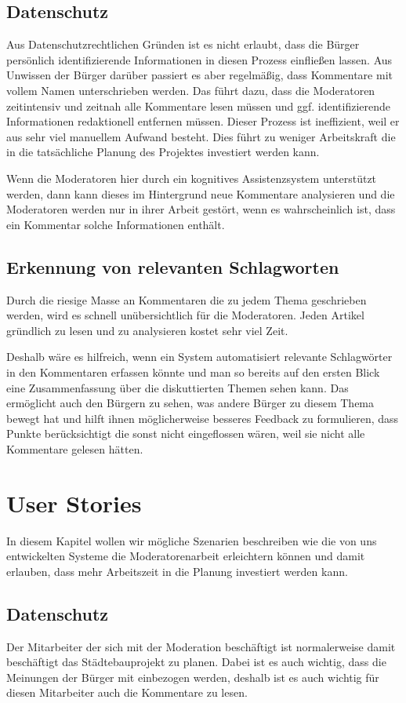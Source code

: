 \documentclass[runningheads]{llncs}
\begin{document}
\subsection{Datenschutz}
Aus Datenschutzrechtlichen Gründen ist es nicht erlaubt, dass die Bürger persönlich identifizierende Informationen in diesen Prozess einfließen lassen.
Aus Unwissen der Bürger darüber passiert es aber regelmäßig, dass Kommentare mit vollem Namen unterschrieben werden.
Das führt dazu, dass die Moderatoren zeitintensiv und zeitnah alle Kommentare lesen müssen und ggf. identifizierende Informationen redaktionell entfernen müssen.
Dieser Prozess ist ineffizient, weil er aus sehr viel manuellem Aufwand besteht.
Dies führt zu weniger Arbeitskraft die in die tatsächliche Planung des Projektes investiert werden kann.

Wenn die Moderatoren hier durch ein kognitives Assistenzsystem unterstützt werden, dann kann dieses im Hintergrund neue Kommentare analysieren und die Moderatoren werden nur in ihrer Arbeit gestört, wenn es wahrscheinlich ist, dass ein Kommentar solche Informationen enthält.

\subsection{Erkennung von relevanten Schlagworten}
Durch die riesige Masse an Kommentaren die zu jedem Thema geschrieben werden, wird es schnell unübersichtlich für die Moderatoren.
Jeden Artikel gründlich zu lesen und zu analysieren kostet sehr viel Zeit.

Deshalb wäre es hilfreich, wenn ein System automatisiert relevante Schlagwörter in den Kommentaren erfassen könnte und man so bereits auf den ersten Blick eine Zusammenfassung über die diskuttierten Themen sehen kann.
Das ermöglicht auch den Bürgern zu sehen, was andere Bürger zu diesem Thema bewegt hat und hilft ihnen möglicherweise besseres Feedback zu formulieren, dass Punkte berücksichtigt die sonst nicht eingeflossen wären, weil sie nicht alle Kommentare gelesen hätten.

\section{User Stories}
In diesem Kapitel wollen wir mögliche Szenarien beschreiben wie die von uns entwickelten Systeme die Moderatorenarbeit erleichtern können und damit erlauben, dass mehr Arbeitszeit in die Planung investiert werden kann.
\subsection{Datenschutz}
Der Mitarbeiter der sich mit der Moderation beschäftigt ist normalerweise damit beschäftigt das Städtebauprojekt zu planen.
Dabei ist es auch wichtig, dass die Meinungen der Bürger mit einbezogen werden, deshalb ist es auch wichtig für diesen Mitarbeiter auch die Kommentare zu lesen.
\end{document}
